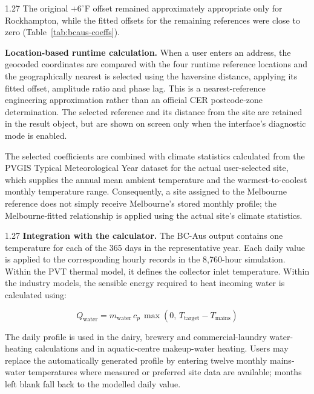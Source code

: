 \documentclass[12pt,letterpaper]{article}
\begin{document}
\begin{spacing}{1.27}
The original $+6^\circ$F offset remained approximately appropriate only for Rockhampton, while the fitted offsets for the remaining references were close to zero (Table~\ref{tab:bcaus-coeffs}).\par

\vspace{0.15in}

\textbf{Location-based runtime calculation.} When a user enters an address, the geocoded coordinates are compared with the four runtime reference locations and the geographically nearest is selected using the haversine distance, applying its fitted offset, amplitude ratio and phase lag. This is a nearest-reference engineering approximation rather than an official CER postcode-zone determination. The selected reference and its distance from the site are retained in the result object, but are shown on screen only when the interface's diagnostic mode is enabled.\par

\vspace{0.15in}

The selected coefficients are combined with climate statistics calculated from the PVGIS Typical Meteorological Year dataset for the actual user-selected site, which supplies the annual mean ambient temperature and the warmest-to-coolest monthly temperature range. Consequently, a site assigned to the Melbourne reference does not simply receive Melbourne's stored monthly profile; the Melbourne-fitted relationship is applied using the actual site's climate statistics.
\end{spacing}

\begin{spacing}{1.27}
\textbf{Integration with the calculator.} The BC-Aus output contains one temperature for each of the 365 days in the representative year. Each daily value is applied to the corresponding hourly records in the 8,760-hour simulation. Within the PVT thermal model, it defines the collector inlet temperature. Within the industry models, the sensible energy required to heat incoming water is calculated using:

\begin{equation}
Q_{\mathrm{water}} = m_{\mathrm{water}}\, c_p\, \max\left(0,\, T_{\mathrm{target}} - T_{\mathrm{mains}}\right)
\label{eq:qwater}
\end{equation}

The daily profile is used in the dairy, brewery and commercial-laundry water-heating calculations and in aquatic-centre makeup-water heating. Users may replace the automatically generated profile by entering twelve monthly mains-water temperatures where measured or preferred site data are available; months left blank fall back to the modelled daily value.
\end{spacing}
\end{document}
